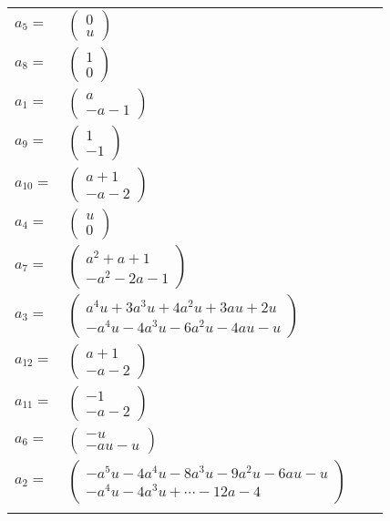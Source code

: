 \documentclass[1p]{elsarticle_modified}
\theoremstyle{definition}
\begin{document}
\begin{tabular}{m{7pt} m{180pt} m{7pt} m{180pt} }
\flushright $a_{5}=$&$\begin{pmatrix}0\\u\end{pmatrix}$ \\
\flushright $a_{8}=$&$\begin{pmatrix}1\\0\end{pmatrix}$ \\
\flushright $a_{1}=$&$\begin{pmatrix}a\\- a-1\end{pmatrix}$ \\
\flushright $a_{9}=$&$\begin{pmatrix}1\\-1\end{pmatrix}$ \\
\flushright $a_{10}=$&$\begin{pmatrix}a+1\\- a-2\end{pmatrix}$ \\
\flushright $a_{4}=$&$\begin{pmatrix}u\\0\end{pmatrix}$ \\
\flushright $a_{7}=$&$\begin{pmatrix}a^2+a+1\\- a^2-2 a-1\end{pmatrix}$ \\
\flushright $a_{3}=$&$\begin{pmatrix}a^4 u+3 a^3 u+4 a^2 u+3 a u+2 u\\- a^4 u-4 a^3 u-6 a^2 u-4 a u- u\end{pmatrix}$ \\
\flushright $a_{12}=$&$\begin{pmatrix}a+1\\- a-2\end{pmatrix}$ \\
\flushright $a_{11}=$&$\begin{pmatrix}-1\\- a-2\end{pmatrix}$ \\
\flushright $a_{6}=$&$\begin{pmatrix}- u\\- a u- u\end{pmatrix}$ \\
\flushright $a_{2}=$&$\begin{pmatrix}- a^5 u-4 a^4 u-8 a^3 u-9 a^2 u-6 a u- u\\- a^4 u-4 a^3 u+\cdots-12 a-4\end{pmatrix}$\\&\end{tabular}
\end{document}
